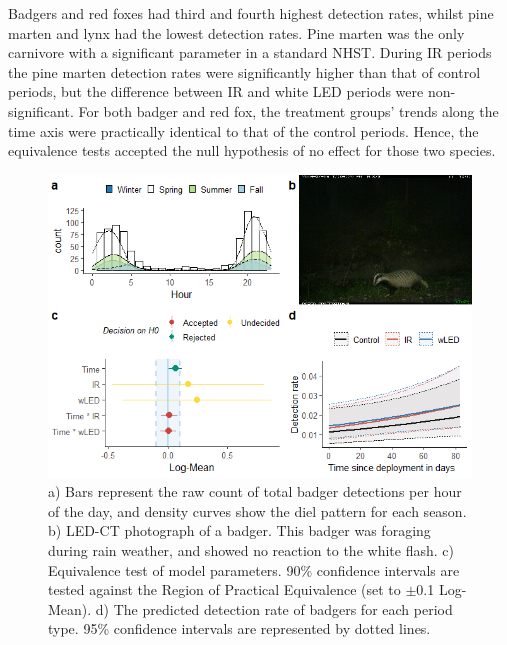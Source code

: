Badgers and red foxes had third and fourth highest detection rates, whilst pine marten and lynx had the lowest detection rates.
Pine marten was the only carnivore with a significant parameter in a standard NHST. During IR periods the pine marten detection rates were significantly higher than that of control periods, but the difference between IR and white LED periods were non-significant.
For both badger and red fox, the treatment groups' trends along the time axis were practically identical to that of the control periods. Hence, the equivalence tests accepted the null hypothesis of no effect for those two species.



\begin{figure}[b]
	\centering
	\includegraphics[width=13cm]{../R/glmm_sp_files/figure-html/grevling2-1.png}
	\caption[Badger]
	{\footnotesize
		a) Bars represent the raw count of total badger detections per hour of the day, and density curves show the diel pattern for each season.
		b) LED-CT photograph of a badger. This badger was foraging during rain weather, and showed no reaction to the white flash.
		c) Equivalence test of model parameters. 90\% confidence intervals are tested against the Region of Practical Equivalence (set to $\pm$0.1 Log-Mean).
		d) The predicted detection rate of badgers for each period type. 95\% confidence intervals are represented by dotted lines.}
	\label{grevling}
\end{figure}

